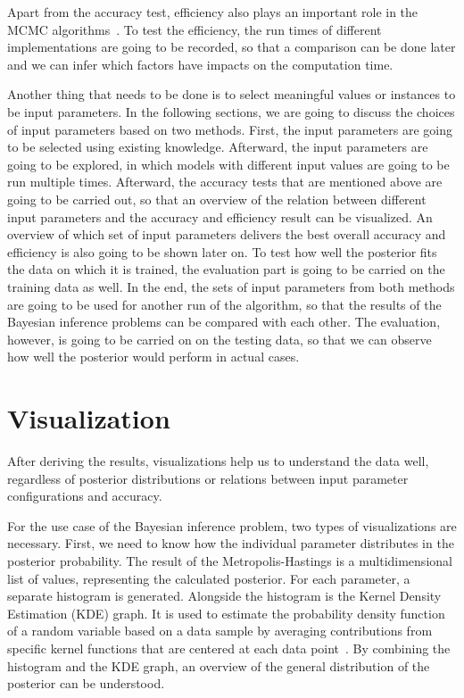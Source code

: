 Apart from the accuracy test, efficiency also plays an important role in the MCMC algorithms~\cite{MCMC_efficiency}. To test the efficiency, the run times of different implementations are going to be recorded, so that a comparison can be done later and we can infer which factors have impacts on the computation time.

Another thing that needs to be done is to select meaningful values or instances to be input parameters. In the following sections, we are going to discuss the choices of input parameters based on two methods. First, the input parameters are going to be selected using existing knowledge. Afterward, the input parameters are going to be explored, in which models with different input values are going to be run multiple times. Afterward, the accuracy tests that are mentioned above are going to be carried out, so that an overview of the relation between different input parameters and the accuracy and efficiency result can be visualized. An overview of which set of input parameters delivers the best overall accuracy and efficiency is also going to be shown later on. To test how well the posterior fits the data on which it is trained, the evaluation part is going to be carried on the training data as well. In the end, the sets of input parameters from both methods are going to be used for another run of the algorithm, so that the results of the Bayesian inference problems can be compared with each other. The evaluation, however, is going to be carried on on the testing data, so that we can observe how well the posterior would perform in actual cases.

\section{Visualization}
After deriving the results, visualizations help us to understand the data well, regardless of posterior distributions or relations between input parameter configurations and accuracy. 

For the use case of the Bayesian inference problem, two types of visualizations are necessary. First, we need to know how the individual parameter distributes in the posterior probability. The result of the Metropolis-Hastings is a multidimensional list of values, representing the calculated posterior. For each parameter, a separate histogram is generated. Alongside the histogram is the Kernel Density Estimation (KDE) graph. It is used to estimate the probability density function of a random variable based on a data sample by averaging contributions from specific kernel functions that are centered at each data point~\cite{kde}. By combining the histogram and the KDE graph, an overview of the general distribution of the posterior can be understood.

